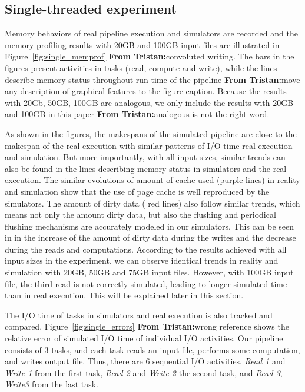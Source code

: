 \documentclass[conference]{IEEEtran}
\newcommand{\tristan}[1]{\color{orange}\textbf{From Tristan:}#1\color{black}}
\begin{document}
		\subsection{Single-threaded experiment}

			Memory behaviors of real pipeline execution and simulators are recorded 
			and the memory profiling results with 20GB and 100GB input files 
			are illustrated in Figure~\ref{fig:single_memprof} \tristan{convoluted writing}. 
			The bars in the figures present activities in tasks (read, compute and write), 
			while the lines describe memory status throughout run time of the pipeline \tristan{move any description of graphical features to the figure caption}. 
			Because the results with 20Gb, 50GB, 100GB are analogous, we only include 
			the results with 20GB and 100GB in this paper \tristan{analogous is not the right word}. 
			
			As shown in the figures, the makespans of the simulated pipeline are 
			close to the makespan of the real execution with similar patterns of I/O time 
			real execution and simulation. 
			But more importantly, with all input sizes, similar trends can also be found 
			in the lines describing memory status in simulators and the real execution. 
			The similar evolutions of amount of cache used (purple lines) in reality 
			and simulation show that the use of page cache is well reproduced by the simulators. 
			The amount of dirty data ( red lines) also follow similar trends, 
			which means not only the amount dirty data, but also the flushing and 
			periodical flushing mechanisms are accurately modeled in our simulators. 
			This can be seen in in the increase of the amount of dirty data during the writes 
			and the decrease during the reads and computations. 
			According to the results achieved with all input sizes in the experiment, 
			we can observe identical trends in reality and simulation with 20GB, 
			50GB and 75GB input files. However, with 100GB input file, 
			the third read is not correctly simulated, leading to longer simulated time 
			than in real execution. This will be explained later in this section.
			
			The I/O time of tasks in simulators and real execution is also tracked and compared. 
			Figure~\ref{fig:single_errors} \tristan{wrong reference} shows the relative error of simulated I/O time 
			of individual I/O activities. 
			Our pipeline consists of 3 tasks, and each task reads an input file, 
			performs some computation, and writes output file. 
			Thus, there are 6 sequential I/O activities, \textit{Read 1} and \textit{Write 1} 
			from the first task, \textit{Read 2} and \textit{Write 2} the second task, 
			and \textit{Read 3}, \textit{Write3} from the last task.
			
\end{document}
